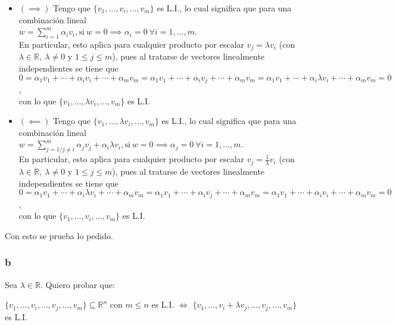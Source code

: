 \documentclass{article}
\begin{document}
\begin{itemize}
    \item[] $(\implies)$ Tengo que $\{v_1,\ldots,v_i,\ldots,v_m\}$ es L.I., lo cual significa que para una combinación 
    lineal \\ $w = \sum_{i=1}^{m} \alpha_{i}v_{i}, \text{si} ~w = 0 \implies \alpha_i = 0 ~ \forall i = 1,\ldots,m$. \\ En
    particular, esto aplica para cualquier producto por escalar $v_j = \lambda v_i$ (con $\lambda \in \mathbb{R}, ~ \lambda \neq 0$ y $1 \leq j \leq m$),
    pues al tratarse de vectores linealmente independientes se tiene que \\
    $0 = \alpha_1v_1+\cdots+\alpha_{i}v_{i}+\cdots+\alpha_{m}v_{m} = 
    \alpha_1v_1+\cdots+\alpha_{i}v_{j}+\cdots+\alpha_{m}v_{m} = 
    \alpha_1v_1+\cdots+\alpha_{i}\lambda v_{i}+\cdots+\alpha_{m}v_{m} = 0$, \\
    con lo que $\{v_1,\ldots,\lambda v_i,\ldots,v_m\}$ es L.I.
    \item[] $(\impliedby)$ Tengo que $\{v_1,\ldots,\lambda v_i,\ldots,v_m\}$ es L.I., lo cual significa que para una combinación 
    lineal \\ $w = \sum_{j=1 / j \neq i}^{m} \alpha_{j}v_{j} + \alpha_i\lambda v_i, \text{si} ~w = 0 \implies \alpha_j = 0 ~ \forall i = 1,\ldots,m$. \\
    En particular, esto aplica para cualquier producto por escalar $v_j = \frac{1}{\lambda}v_i$ (con $\lambda \in \mathbb{R}, ~\lambda \neq 0$ y $1 \leq j \leq m$),
    pues al tratarse de vectores linealmente independientes se tiene que \\
    $0 = \alpha_1v_1+\cdots+\alpha_{i}\lambda v_{i}+\cdots+\alpha_{m}v_{m} = 
    \alpha_1v_1+\cdots+\alpha_{i}v_{j}+\cdots+\alpha_{m}v_{m} = 
    \alpha_1v_1+\cdots+\alpha_{i}v_{i}+\cdots+\alpha_{m}v_{m} = 0$, \\
    con lo que $\{v_1,\ldots,v_i,\ldots,v_m\}$ es L.I.
\end{itemize}

\noindent Con esto se prueba lo pedido.

\subsubsection*{b}

Sea $\lambda \in \mathbb{R}$. Quiero probar que:

\begin{center}
    $\{v_1,\ldots,v_i,\ldots,v_j,\ldots,v_m\} \subseteq \mathbb{R}^{n}$ con $m \leq n$ es L.I. 
    $\iff$ 
    $\{v_1,\ldots,v_i + \lambda v_j,\ldots,v_j,\ldots,v_m\}$ es L.I.
\end{center}
\end{document}
